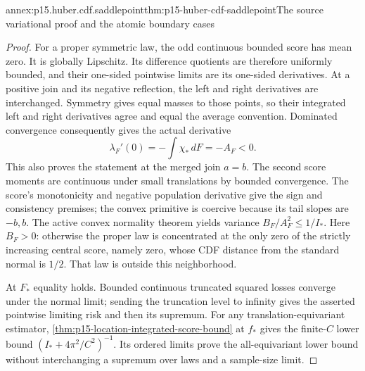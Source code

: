 \begin{annexitem}{annex:p15.huber.cdf.saddlepoint}{thm:p15-huber-cdf-saddlepoint}{The source variational proof and the atomic boundary cases}
\begin{proof}
For a proper symmetric law, the odd continuous bounded score has
mean zero. It is globally Lipschitz. Its difference quotients are
therefore uniformly bounded, and their one-sided pointwise limits
are its one-sided derivatives. At a positive join and its negative
reflection, the left and right derivatives are interchanged.
Symmetry gives equal masses to those points, so their integrated
left and right derivatives agree and equal the average convention.
Dominated convergence consequently gives the actual derivative
\[
 \lambda_F'(0)=-\int\chi_*\,dF=-A_F<0.
\]
This also proves the statement at the merged join \(a=b\).
The second score moments are continuous under small translations
by bounded convergence. The score's monotonicity and negative
population derivative give the sign and consistency premises;
the convex primitive is coercive because its tail slopes are
\(-b,b\). The active convex normality theorem yields variance
\(B_F/A_F^2\leq1/I_*\).
Here \(B_F>0\): otherwise the proper law is concentrated at the
only zero of the strictly increasing central score, namely zero,
whose CDF distance from the standard normal is \(1/2\).
That law is outside this neighborhood.

At \(F_*\) equality holds. Bounded continuous truncated squared
losses converge under the normal limit; sending the truncation
level to infinity gives the asserted pointwise limiting risk
and then its supremum. For any translation-equivariant estimator,
\cref{thm:p15-location-integrated-score-bound} at \(f_*\) gives
the finite-\(C\) lower bound
\((I_*+4\pi^2/C^2)^{-1}\). Its ordered limits prove the
all-equivariant lower bound without interchanging a supremum
over laws and a sample-size limit.
\end{proof}
\end{annexitem}

